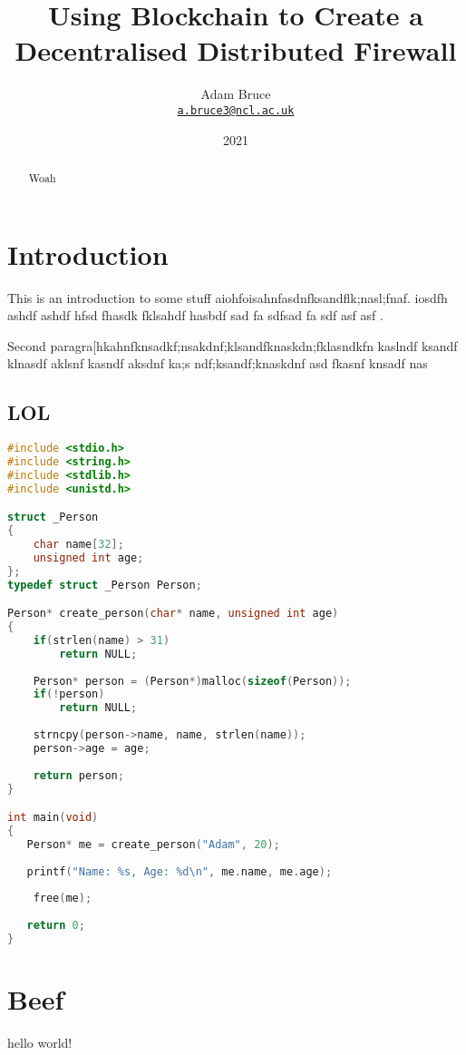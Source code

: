 \documentclass{article}
\title{Using Blockchain to Create a Decentralised Distributed Firewall}
\date{2021}
\author{Adam Bruce \\ \texttt{\href{mailto:a.bruce3@ncl.ac.uk}{a.bruce3@ncl.ac.uk}}}
\begin{document}
\maketitle

\begin{abstract}
Woah
\end{abstract}

\newpage
\tableofcontents
\newpage

\section{Introduction}
This is an introduction to some stuff aiohfoisahnfasdnfksandflk;nasl;fnaf. iosdfh ashdf ashdf hfsd fhasdk fklsahdf hasbdf sad fa sdfsad fa sdf asf asf .

Second paragra[hkahnfknsadkf;nsakdnf;klsandfknaskdn;fklasndkfn kaslndf ksandf klnasdf aklsnf kasndf aksdnf ka;s ndf;ksandf;knaskdnf asd fkasnf knsadf nas

\subsection{LOL}

\begin{lstlisting}[language=c,style=c]
#include <stdio.h>
#include <string.h>
#include <stdlib.h>
#include <unistd.h>

struct _Person
{
	char name[32];
	unsigned int age;
};
typedef struct _Person Person;

Person* create_person(char* name, unsigned int age)
{
	if(strlen(name) > 31)
		return NULL;
	
	Person* person = (Person*)malloc(sizeof(Person));
	if(!person)
		return NULL;
		
	strncpy(person->name, name, strlen(name));
	person->age = age;
	
	return person;
}

int main(void)
{
   Person* me = create_person("Adam", 20);
   
   printf("Name: %s, Age: %d\n", me.name, me.age);
   
	free(me);   
   
   return 0;
}
\end{lstlisting}

\section{Beef}
hello world!
\end{document}
